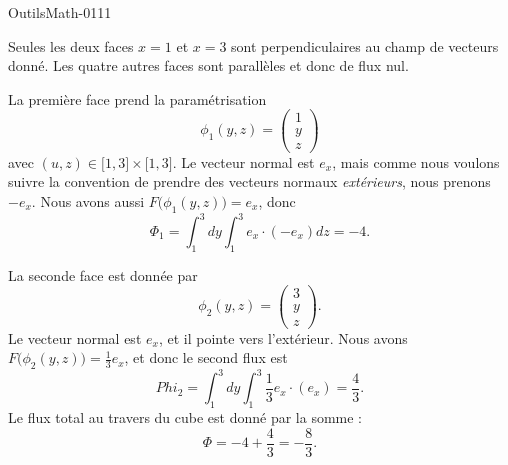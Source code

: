
\begin{corrige}{OutilsMath-0111}

    Seules les deux faces $x=1$ et $x=3$ sont perpendiculaires au champ de vecteurs donné. Les quatre autres faces sont parallèles et donc de flux nul.

    La première face prend la paramétrisation
    \begin{equation}
        \phi_1(y,z)=\begin{pmatrix}
            1    \\ 
            y    \\ 
            z    
        \end{pmatrix}
    \end{equation}
    avec $(u,z)\in\mathopen[ 1 , 3 \mathclose]\times \mathopen[ 1 , 3 \mathclose]$. Le vecteur normal est $e_x$, mais comme nous voulons suivre la convention de prendre des vecteurs normaux \emph{extérieurs}, nous prenons $-e_x$.
    Nous avons aussi $F\big( \phi_1(y,z) \big)=e_x$, donc
    \begin{equation}
        \Phi_1=\int_1^3dy\int_1^3 e_x\cdot (-e_x)dz=-4.
    \end{equation}
    
    La seconde face est donnée par
    \begin{equation}
        \phi_2(y,z)=\begin{pmatrix}
            3    \\ 
            y    \\ 
            z    
        \end{pmatrix}.
    \end{equation}
    Le vecteur normal est $e_x$, et il pointe vers l'extérieur. Nous avons $F\big( \phi_2(y,z) \big)=\frac{1}{ 3 }e_x$, et donc le second flux est
    \begin{equation}
        Phi_2=\int_1^3dy\int_1^3\frac{1}{ 3 }e_x\cdot (e_x)=\frac{ 4 }{ 3 }.
    \end{equation}
    Le flux total au travers du cube est donné par la somme :
    \begin{equation}
        \Phi=-4+\frac{ 4 }{ 3 }=-\frac{ 8 }{ 3 }.
    \end{equation}

\end{corrige}
